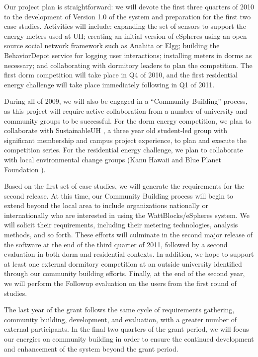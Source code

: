 Our project plan is straightforward: we will devote the first three
quarters of 2010 to the development of Version 1.0 of the system and
preparation for the first two case studies.  Activities will include:
expanding the set of sensors to support the energy meters used at UH;
creating an initial version of eSpheres using an open source social network
framework such as Anahita or Elgg; building the BehaviorDepot service for
logging user interactions; installing meters in dorms as necessary; and
collaborating with dormitory leaders to plan the competition. The first
dorm competition will take place in Q4 of 2010, and the first residential
energy challenge will take place immediately following in Q1 of 2011.

During all of 2009, we will also be engaged in a ``Community Building''
process, as this project will require active collaboration from a number of
university and community groups to be successful.  For the dorm energy
competition, we plan to collaborate with SustainableUH
\cite{SustainableUH}, a three year old student-led group with significant
membership and campus project experience, to plan and execute the
competition series.  For the residential energy challenge, we plan to
collaborate with local environmental change groups (Kanu Hawaii
\cite{KanuHawaii} and Blue Planet Foundation \cite{BluePlanetFoundation}).

Based on the first set of case studies, we will generate the requirements
for the second release.  At this time, our Community Building process will
begin to extend beyond the local area to include organizations nationally
or internationally who are interested in using the WattBlocks/eSpheres
system.  We will solicit their requirements, including their metering
technologies, analysis methods, and so forth.  These efforts will culminate
in the second major release of the software at the end of the third quarter
of 2011, followed by a second evaluation in both dorm and residential
contexts. In addition, we hope to support at least one external dormitory
competition at an outside university identified through our community
building efforts.  Finally, at the end of the second year, we will perform
the Followup evaluation on the users from the first round of studies.

The last year of the grant follows the same cycle of requirements
gathering, community building, development, and evaluation, with a greater
number of external participants.  In the final two quarters of the grant
period, we will focus our energies on community building in order to ensure
the continued development and enhancement of the system beyond the grant
period.

